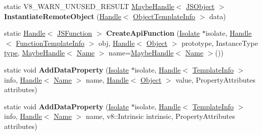 \begin{DoxyCompactItemize}
static V8\+\_\+\+W\+A\+R\+N\+\_\+\+U\+N\+U\+S\+E\+D\+\_\+\+R\+E\+S\+U\+LT \mbox{\hyperlink{classv8_1_1internal_1_1MaybeHandle}{Maybe\+Handle}}$<$ \mbox{\hyperlink{classv8_1_1internal_1_1JSObject}{J\+S\+Object}} $>$ {\bfseries Instantiate\+Remote\+Object} (\mbox{\hyperlink{classv8_1_1internal_1_1Handle}{Handle}}$<$ \mbox{\hyperlink{classv8_1_1internal_1_1ObjectTemplateInfo}{Object\+Template\+Info}} $>$ data)
\item 
\mbox{\label{classv8_1_1internal_1_1ApiNatives_ab3d620dee0e793907e077bd8731d58ba}} 
static \mbox{\hyperlink{classv8_1_1internal_1_1Handle}{Handle}}$<$ \mbox{\hyperlink{classv8_1_1internal_1_1JSFunction}{J\+S\+Function}} $>$ {\bfseries Create\+Api\+Function} (\mbox{\hyperlink{classv8_1_1internal_1_1Isolate}{Isolate}} $\ast$isolate, \mbox{\hyperlink{classv8_1_1internal_1_1Handle}{Handle}}$<$ \mbox{\hyperlink{classv8_1_1internal_1_1FunctionTemplateInfo}{Function\+Template\+Info}} $>$ obj, \mbox{\hyperlink{classv8_1_1internal_1_1Handle}{Handle}}$<$ \mbox{\hyperlink{classv8_1_1internal_1_1Object}{Object}} $>$ prototype, Instance\+Type \mbox{\hyperlink{classstd_1_1conditional_1_1type}{type}}, \mbox{\hyperlink{classv8_1_1internal_1_1MaybeHandle}{Maybe\+Handle}}$<$ \mbox{\hyperlink{classv8_1_1internal_1_1Name}{Name}} $>$ name=\mbox{\hyperlink{classv8_1_1internal_1_1MaybeHandle}{Maybe\+Handle}}$<$ \mbox{\hyperlink{classv8_1_1internal_1_1Name}{Name}} $>$())
\item 
\mbox{\label{classv8_1_1internal_1_1ApiNatives_ae3ee4ad0fcbf129bbdc461d1bb3efa1a}} 
static void {\bfseries Add\+Data\+Property} (\mbox{\hyperlink{classv8_1_1internal_1_1Isolate}{Isolate}} $\ast$isolate, \mbox{\hyperlink{classv8_1_1internal_1_1Handle}{Handle}}$<$ \mbox{\hyperlink{classv8_1_1internal_1_1TemplateInfo}{Template\+Info}} $>$ info, \mbox{\hyperlink{classv8_1_1internal_1_1Handle}{Handle}}$<$ \mbox{\hyperlink{classv8_1_1internal_1_1Name}{Name}} $>$ name, \mbox{\hyperlink{classv8_1_1internal_1_1Handle}{Handle}}$<$ \mbox{\hyperlink{classv8_1_1internal_1_1Object}{Object}} $>$ value, Property\+Attributes attributes)
\item 
\mbox{\label{classv8_1_1internal_1_1ApiNatives_a00f025df8155d3f3aa5949422109f23e}} 
static void {\bfseries Add\+Data\+Property} (\mbox{\hyperlink{classv8_1_1internal_1_1Isolate}{Isolate}} $\ast$isolate, \mbox{\hyperlink{classv8_1_1internal_1_1Handle}{Handle}}$<$ \mbox{\hyperlink{classv8_1_1internal_1_1TemplateInfo}{Template\+Info}} $>$ info, \mbox{\hyperlink{classv8_1_1internal_1_1Handle}{Handle}}$<$ \mbox{\hyperlink{classv8_1_1internal_1_1Name}{Name}} $>$ name, v8\+::\+Intrinsic intrinsic, Property\+Attributes attributes)

\end{DoxyCompactItemize}
